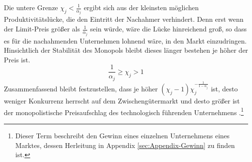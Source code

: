 %
Die untere Grenze $\chi_j<\frac{1}{\alpha_j}$ ergibt sich aus der kleinsten möglichen Produktivitätslücke, die den Eintritt der Nachahmer verhindert. Denn erst wenn der Limit-Preis größer als $\frac{1}{\alpha_j}$ sein würde, wäre die Lücke hinreichend groß, so dass es für die nachahmenden Unternehmen lohnend wäre, in den Markt einzudringen.\\
%
Hinsichtlich der Stabilität des Monopols bleibt dieses länger bestehen je höher der Preis ist. 
%
	\begin{equation} 
		\frac{1}{\alpha_j}\geq\chi_j>1
	\end{equation}
%
Zusammenfassend bleibt festzustellen, dass je höher $(\chi_j-1)\chi_j^{-\frac{1}{1-\alpha_j}}$ ist, desto weniger Konkurrenz herrscht auf dem Zwischengütermarkt und desto größer ist der monopolistische  Preisaufschlag des technologisch führenden Unternehmens \cite{Acemoglu.2006}.\footnote{Dieser Term beschreibt den Gewinn eines einzelnen Unternehmens eines Marktes, dessen Herleitung in Appendix \ref{sec:Appendix-Gewinn} zu finden ist.} 
%
